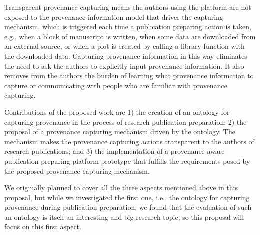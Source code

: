 Transparent provenance capturing means the authors using the platform are not exposed to the provenance information model that drives the capturing mechanism, which is triggered each time a publication preparing action is taken, e.g., when a block of manuscript is written, when some data are downloaded from an external source, or when a plot is created by calling a library function with the downloaded data. Capturing provenance information in this way eliminates the need to ask the authors to explicitly input provenance information. It also removes from the authors the burden of learning what provenance information to capture or communicating with people who are familiar with provenance capturing.

Contributions of the proposed work are 1) the creation of an ontology for capturing provenance in the process of research publication preparation; 2) the proposal of a provenance capturing mechanism driven by the ontology. The mechanism makes the provenance capturing actions transparent to the authors of research publications; and 3) the implementation of a provenance aware publication preparing platform prototype that fulfills the requirements posed by the proposed provenance capturing mechanism.

We originally planned to cover all the three aspects mentioned above in this proposal, but while we investigated the first one, i.e., the ontology for capturing provenance during publication preparation, we found that the evaluation of such an ontology is itself an interesting and big research topic, so this proposal will focus on this first aspect.
%
%
%
%
